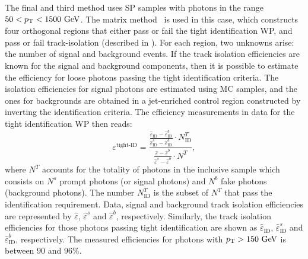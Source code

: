 The final and third method uses \ac{SP} samples with photons in the range \(50<p_{\text{T}}<1500~\text{GeV}\). The matrix method~\cite{ATLAS-EGamma-Performance-2015-2016} is used in this case, which constructs four orthogonal regions that either pass or fail the tight identification \ac{WP}, and pass or fail track-isolation (described in \Sect{\ref{subsec:objects:egamma:iso}}). For each region, two unknowns arise: the number of signal and background events.
If the track isolation efficiencies are known for the signal and background components, then it is possible to estimate the efficiency for loose photons passing the tight identification criteria. The isolation efficiencies for signal photons are estimated using \ac{MC} samples, and the ones for backgrounds are obtained in a jet-enriched control region constructed by inverting the identification criteria.
The efficiency measurements in data for the tight identification \ac{WP} then reads:
\begin{equation}
    \varepsilon^{\text{tight-ID}} = \frac{
        \frac{
            \hat{\varepsilon}_{\text{ID}} - \hat{\varepsilon}_{\text{ID}}^b
        }{
            \hat{\varepsilon}_{\text{ID}}^s - \hat{\varepsilon}_{\text{ID}}^b
        }
        \cdot
        N_{\text{ID}}^T
    }{
        \frac{
            \hat{\varepsilon} - \hat{\varepsilon}^b
        }{
            \hat{\varepsilon}^s - \hat{\varepsilon}^b
        }
        \cdot
        N^T
    },
\end{equation}
where \(N^T\) accounts for the totality of photons in the inclusive sample which consists on \(N^s\) prompt photons (or signal photons) and \(N^b\) fake photons (background photons). The number \(N^T_{\text{ID}}\) is the subset of \(N^T\) that pass the identification requirement. Data, signal and background track isolation efficiencies are represented by \(\hat{\varepsilon}\), \(\hat{\varepsilon}^s\) and \(\hat{\varepsilon}^b\), respectively. Similarly, the track isolation efficiencies for those photons passing tight identification are shown as \(\hat{\varepsilon}_{\text{ID}}\), \(\hat{\varepsilon}_{\text{ID}}^s\) and \(\hat{\varepsilon}_{\text{ID}}^b\), respectively. The measured efficiencies for photons with \(p_{\text{T}}>150~\text{GeV}\) is between \(90\) and \(96\%\).





